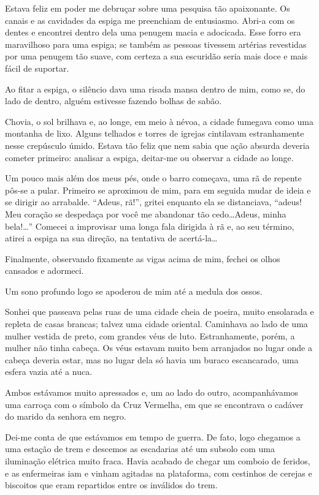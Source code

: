 Estava feliz em poder me debruçar sobre uma pesquisa tão apaixonante. Os canais e as cavidades da espiga me preenchiam de entusiasmo. Abri-a com os dentes e encontrei dentro dela uma penugem macia e adocicada. Esse forro era maravilhoso para uma espiga; se também as pessoas tivessem artérias revestidas por uma penugem tão suave, com certeza a sua escuridão seria mais doce e mais fácil de suportar.

Ao fitar a espiga, o silêncio dava uma risada mansa dentro de mim, como se, do lado de dentro, alguém estivesse fazendo bolhas de sabão.

Chovia, o sol brilhava e, ao longe, em meio à névoa, a cidade fumegava como uma montanha de lixo. Alguns telhados e torres de igrejas cintilavam estranhamente nesse crepúsculo úmido. Estava tão feliz que nem sabia que ação absurda deveria cometer primeiro: analisar a espiga, deitar-me ou observar a cidade ao longe.

Um pouco mais além dos meus pés, onde o barro começava, uma rã de repente pôs-se a pular. Primeiro se aproximou de mim, para em seguida mudar de ideia e se dirigir ao arrabalde. ``Adeus, rã!'', gritei enquanto ela se distanciava, ``adeus! Meu coração se despedaça por você me abandonar tão cedo\dots Adeus, minha bela!\dots'' Comecei a improvisar uma longa fala dirigida à rã e, ao seu término, atirei a espiga na sua direção, na tentativa de acertá-la\dots

Finalmente, observando fixamente as vigas acima de mim, fechei os olhos cansados e adormeci.

Um sono profundo logo se apoderou de mim até a medula dos ossos.

Sonhei que passeava pelas ruas de uma cidade cheia de poeira, muito ensolarada e repleta de casas brancas; talvez uma cidade oriental. Caminhava ao lado de uma mulher vestida de preto, com grandes véus de luto. Estranhamente, porém, a mulher não tinha cabeça. Os véus estavam muito bem arranjados no lugar onde a cabeça deveria estar, mas no lugar dela só havia um buraco escancarado, uma esfera vazia até a nuca.

Ambos estávamos muito apressados e, um ao lado do outro, acompanhávamos uma carroça com o símbolo da Cruz Vermelha, em que se encontrava o cadáver do marido da senhora em negro.

Dei-me conta de que estávamos em tempo de guerra. De fato, logo chegamos a uma estação de trem e descemos as escadarias até um subsolo com uma iluminação elétrica muito fraca. Havia acabado de chegar um comboio de feridos, e as enfermeiras iam e vinham agitadas na plataforma, com cestinhos de cerejas e biscoitos que eram repartidos entre os inválidos do trem.

